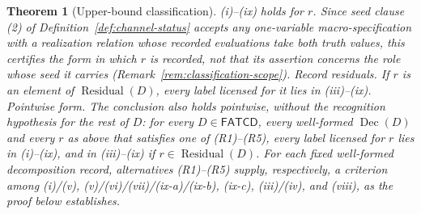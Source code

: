 \documentclass[11pt]{article}
\newtheorem{theorem}{Theorem}[section]
\theoremstyle{definition}
\newcommand{\FATCD}{\ensuremath{\mathsf{FATCD}}}
\newcommand{\Dec}[1]{\ensuremath{\operatorname{Dec}\!\left(#1\right)}}
\newcommand{\Residual}[1]{\ensuremath{\operatorname{Residual}\!\left(#1\right)}}
\begin{document}
\begin{theorem}[Upper-bound classification]
(i)--(ix) holds for \(r\). Since seed clause (2) of
Definition~\ref{def:channel-status} accepts any one-variable macro-specification with a realization relation
whose recorded evaluations take both truth values, this certifies the form in
which \(r\) is recorded, not that its assertion concerns the role whose seed it
carries (Remark~\ref{rem:classification-scope}). \emph{Record residuals.} If \(r\) is an element of \(\Residual{D}\), every label licensed for it
lies in (iii)--(ix). \emph{Pointwise form.} The conclusion also holds pointwise, without the
recognition hypothesis for the rest of \(D\): for every \(D\in\FATCD{}\), every
well-formed \(\Dec{D}\) and every \(r\) as above that satisfies one of
(R1)--(R5), every label licensed for \(r\) lies in (i)--(ix), and in
(iii)--(ix) if \(r\in\Residual{D}\). For each fixed well-formed decomposition
record, alternatives (R1)--(R5) supply, respectively, a criterion among
(i)/(v), (v)/(vi)/(vii)/(ix-a)/(ix-b), (ix-c), (iii)/(iv), and (viii), as the
proof below establishes.
\end{theorem}
\end{document}
